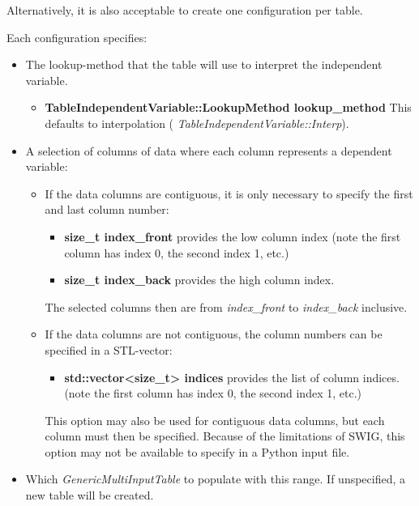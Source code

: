 \documentclass[11pt,fleqn]{report}
\begin{document}
Alternatively, it is also acceptable to create one configuration per table.

Each configuration specifies:
\begin{itemize}
 \item The lookup-method that the table will use to interpret the
       independent variable.
       \begin{itemize}
        \item \textbf{TableIndependentVariable::LookupMethod lookup\_method}
              This defaults to interpolation (
              \textit{TableIndependentVariable::Interp}).
       \end{itemize}
 \item A selection of columns of data where each column
       represents a dependent variable:
       \begin{itemize}
       \item If the data columns are contiguous, it is only necessary to
             specify the first and last column number:
             \begin{itemize}
              \item \textbf{size\_t index\_front} provides the low column index
                    (note the first column has index 0, the second index 1, etc.)
              \item \textbf{size\_t index\_back} provides the high column index.
             \end{itemize}
             The selected columns then are from \textit{index\_front} to
             \textit{index\_back} inclusive.
       \item If the data columns are not contiguous, the column numbers can be
             specified in a STL-vector:
             \begin{itemize}
              \item \textbf{std::vector<size\_t> indices} provides the list of
                    column indices.
                    (note the first column has index 0, the second index 1, etc.)
             \end{itemize}
             This option may also be used for contiguous data columns, but each
             column must then be specified. Because of the limitations of SWIG,
             this option may not be available to specify in a Python input
             file.
       \end{itemize}
 \item Which \textit{GenericMultiInputTable} to populate with this
       range.  If unspecified, a new table will be created.

\end{itemize}
\end{document}
